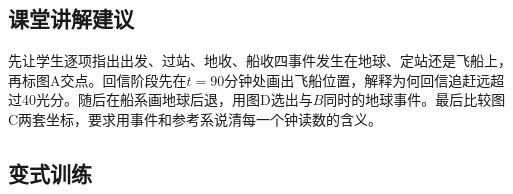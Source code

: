 \documentclass[UTF8,fontset=fandol,a4paper,11pt]{ctexart}
\begin{document}


\subsection*{课堂讲解建议}

先让学生逐项指出出发、过站、地收、船收四事件发生在地球、定站还是飞船上，再标图A交点。回信阶段先在$t=90$分钟处画出飞船位置，解释为何回信追赶远超过40光分。随后在船系画地球后退，用图D选出与$B$同时的地球事件。最后比较图C两套坐标，要求用事件和参考系说清每一个钟读数的含义。



\subsection*{变式训练}
\end{document}
